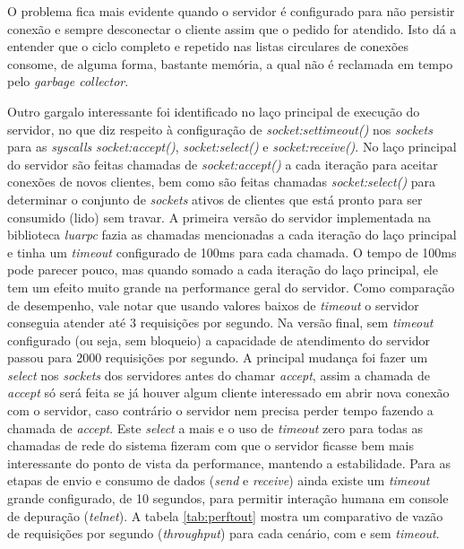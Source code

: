\documentclass[11pt]{article}
\begin{document}
O problema fica mais evidente quando o servidor é configurado para não persistir
conexão e sempre desconectar o cliente assim que o pedido for atendido. Isto dá
a entender que o ciclo completo e repetido nas listas circulares de conexões
consome, de alguma forma, bastante memória, a qual não é reclamada em tempo pelo
\textit{garbage collector}.

Outro gargalo interessante foi identificado no laço principal de execução do
servidor, no que diz respeito à configuração de \textit{socket:settimeout()} nos
\textit{sockets} para as \textit{syscalls} \textit{socket:accept()},
\textit{socket:select()} e \textit{socket:receive()}. No laço principal do
servidor são feitas chamadas de \textit{socket:accept()} a cada iteração para
aceitar conexões de novos clientes, bem como são feitas chamadas
\textit{socket:select()} para determinar o conjunto de \textit{sockets} ativos
de clientes que está pronto para ser consumido (lido) sem travar. A primeira
versão do servidor implementada na biblioteca \textit{luarpc} fazia as chamadas
mencionadas a cada iteração do laço principal e tinha um \textit{timeout}
configurado de 100ms para cada chamada. O tempo de 100ms pode parecer pouco, mas
quando somado a cada iteração do laço principal, ele tem um efeito muito grande
na performance geral do servidor. Como comparação de desempenho, vale notar que
usando valores baixos de \textit{timeout} o servidor conseguia atender até 3
requisições por segundo. Na versão final, sem \textit{timeout} configurado (ou
seja, sem bloqueio) a capacidade de atendimento do servidor passou para 2000
requisições por segundo. A principal mudança foi fazer um \textit{select} nos
\textit{sockets} dos servidores antes do chamar \textit{accept}, assim a chamada
de \textit{accept} só será feita se já houver algum cliente interessado em abrir
nova conexão com o servidor, caso contrário o servidor nem precisa perder tempo
fazendo a chamada de \textit{accept}. Este \textit{select} a mais e o uso de
\textit{timeout} zero para todas as chamadas de rede do sistema fizeram com que
o servidor ficasse bem mais interessante do ponto de vista da performance,
mantendo a estabilidade. Para as etapas de envio e consumo de dados
(\textit{send} e \textit{receive}) ainda existe um \textit{timeout} grande
configurado, de 10 segundos, para permitir interação humana em console de
depuração (\textit{telnet}). A tabela \ref{tab:perftout} mostra um comparativo
de vazão de requisições por segundo (\textit{throughput}) para cada cenário, com
e sem \textit{timeout}.
\end{document}
